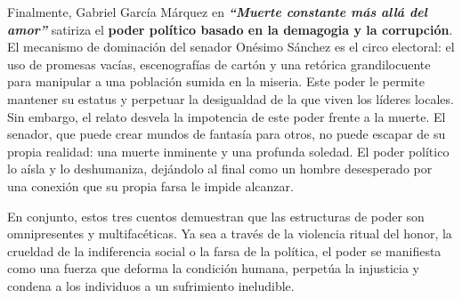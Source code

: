 \documentclass[12pt, letterpaper]{article}
\begin{document}
Finalmente, Gabriel García Márquez en \textbf{\textit{``Muerte constante más allá del amor''}} satiriza el \textbf{poder político basado en la demagogia y la corrupción}. El mecanismo de dominación del senador Onésimo Sánchez es el circo electoral: el uso de promesas vacías, escenografías de cartón y una retórica grandilocuente para manipular a una población sumida en la miseria. Este poder le permite mantener su estatus y perpetuar la desigualdad de la que viven los líderes locales. Sin embargo, el relato desvela la impotencia de este poder frente a la muerte. El senador, que puede crear mundos de fantasía para otros, no puede escapar de su propia realidad: una muerte inminente y una profunda soledad. El poder político lo aísla y lo deshumaniza, dejándolo al final como un hombre desesperado por una conexión que su propia farsa le impide alcanzar.

En conjunto, estos tres cuentos demuestran que las estructuras de poder son omnipresentes y multifacéticas. Ya sea a través de la violencia ritual del honor, la crueldad de la indiferencia social o la farsa de la política, el poder se manifiesta como una fuerza que deforma la condición humana, perpetúa la injusticia y condena a los individuos a un sufrimiento ineludible.
\end{document}
